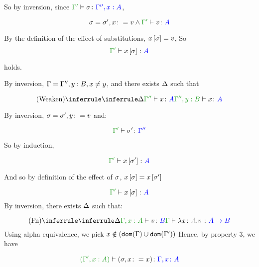 \documentclass{report}
\begin{document}
        So by inversion, since $\typerelation{\G'}{\si}{\G'', x:A}$, 

        \begin{equation}
            \si = \si', x\setto v \wedge \typerelation{\G'}{v}{A}
        \end{equation}

        By the definition of the effect of substitutions, $x\left[\sigma\right] = v$, So
        \begin{equation}
            \typerelation{\G'}{x\ssi}{A}
        \end{equation}

        holds.
        
        By inversion, $\Gamma = \Gamma'', y: B, x \neq y$, and there exists $\Delta$ such that

        \begin{equation}
            \ntreeruleI{Weaken}{\treeruleI{\D}{\typerelation{\G''}{x}{A}}}{\typerelation{\G'', y: B}{x}{A}}
        \end{equation}

        By inversion, $\sigma = \sigma', y\colon= v$
        and:

        \begin{equation}
            \typerelation{\G'}{\si'}{\G''}
        \end{equation}

        So by induction,

        \begin{equation}
            \typerelation{\G'}{x\sub{\si'}}{A}
        \end{equation}

        And so by definition of the effect of $\sigma$, $x\left[\sigma\right] = x\left[\sigma'\right]$

        \begin{equation}
            \typerelation{\G'}{x\sub{\si}}{A}
        \end{equation}
    By inversion, there exists $\Delta$ such that:

    \begin{equation}
        \ntreeruleI{Fn}{
            \treeruleI{\D}{\typerelation{\G, x:A }{v}{B}}
        }{\typerelation{\G}{\lam{x}{A}{v}}{\ab}}
    \end{equation}
    Using alpha equivalence, we pick $x\notin(\texttt{dom}(\Gamma)\cup\texttt{dom}(\Gamma'))$
    Hence, by property 3, we have

    \begin{equation}
        \typerelation{(\G', x:A )}{(\si, x\setto x)}{\gax}
    \end{equation}
\end{document}
